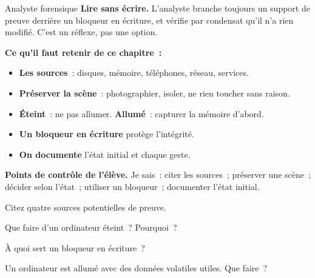 \begin{boxmetier}{Analyste forensique}
\textbf{Lire sans écrire.} L'analyste branche toujours un support de preuve
derrière un bloqueur en écriture, et vérifie par condensat qu'il n'a rien
modifié. C'est un réflexe, pas une option.
\end{boxmetier}

\separateur

\begin{boxresume}
\textbf{Ce qu'il faut retenir de ce chapitre~:}
\begin{itemize}
    \item \textbf{Les sources}~: disques, mémoire, téléphones, réseau,
          services.
    \item \textbf{Préserver la scène}~: photographier, isoler, ne rien
          toucher sans raison.
    \item \textbf{Éteint}~: ne pas allumer. \textbf{Allumé}~: capturer la
          mémoire d'abord.
    \item \textbf{Un bloqueur en écriture} protège l'intégrité.
    \item \textbf{On documente} l'état initial et chaque geste.
\end{itemize}
\end{boxresume}

\begin{boxinfo}
\textbf{Points de contrôle de l'élève.} Je sais~: citer les sources~;
préserver une scène~; décider selon l'état~; utiliser un bloqueur~;
documenter l'état initial.
\end{boxinfo}

\bigskip

\begin{boxexo}[title={\ding{45}\quad Exercice~7.1. Sources \niveaubase}]
Citez quatre sources potentielles de preuve.
\end{boxexo}

\begin{boxexo}[title={\ding{45}\quad Exercice~7.2. Éteint \niveaubase}]
Que faire d'un ordinateur éteint~? Pourquoi~?
\end{boxexo}

\begin{boxexo}[title={\ding{45}\quad Exercice~7.3. Bloqueur \niveaubase}]
À quoi sert un bloqueur en écriture~?
\end{boxexo}

\begin{boxexo}[title={\ding{45}\quad Exercice~7.4. Allumé \niveaumoyen}]
Un ordinateur est allumé avec des données volatiles utiles. Que faire~?
\end{boxexo}

